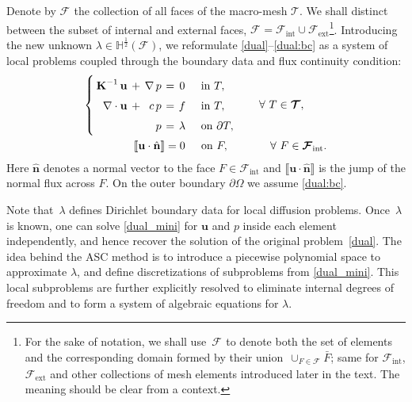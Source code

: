 \documentclass[12pt]{article}
\newcommand{\vect}[1]{\boldsymbol{\mathbf{#1}}}
\newcommand{\bcell}{T}
\newcommand{\bmesh}{{\vect{\mathcal T}}}
\newcommand{\bface}{F}
\newcommand{\bfaces}[1][]{{\vect{\mathcal F}_{\text{#1}}}}
\newcommand{\HHalfSpace}[1][\bface]{{\mathbb H^{\frac{1}{2}}\left({#1}\right)}}
\begin{document}
	Denote by $\bfaces$ the collection of all faces of the macro-mesh $\bmesh$. We shall distinct between the subset of internal and external faces,  $\bfaces = \bfaces[int] \cup \bfaces[ext]$\footnote{For the sake of  notation, we shall use~$\bfaces$ to denote both the set of elements and the corresponding domain formed by their union~$\cup_{F\in \bfaces} \bar{F}$; same for $\bfaces[int]$, $\bfaces[ext]$ and other collections of mesh elements introduced later in the text. The meaning should be clear from a context.}.
	Introducing the new unknown $\lambda \in \HHalfSpace[\bfaces]$, we reformulate \eqref{dual}--\eqref{dual:bc} as a system of local problems coupled through the boundary data
	and flux continuity condition:
	\begin{eqnarray}
		\arraycolsep=2pt\def\arraystretch{1.5}
		\left\{\begin{array}{rcrccl}
			\vect K^{-1}\,\vect u                    & + & \nabla\,p & = & 0       &\quad\text{in } \bcell, \\
			\nabla\cdot\vect u                       & + & c\,p      & = & f       &\quad\text{in } \bcell, \\
			                                         &   & p         & = & \lambda &\quad\text{on } \partial\bcell, %
		\end{array}\right.
		& \qquad \forall~\bcell\in\bmesh, \label{dual_mini} \\
		\llbracket\vect u \cdot \hat{\vect n}\rrbracket = 0\quad\:\:\text{on } F,\:\:\:\:
		& \qquad\quad \forall~F\in\bfaces[int]. \label{flux_cond}
	\end{eqnarray}
	Here $\hat{\vect n}$ denotes a normal vector to the face $F\in\bfaces[int]$ and $\llbracket \vect u\cdot\hat{\vect n} \rrbracket$ is the jump of the normal flux across $F$. On the outer boundary $\partial\Omega$ we assume \eqref{dual:bc}.
	
	Note that~$\lambda$ defines Dirichlet boundary data for local diffusion problems. Once~$\lambda$ is known, one can solve \eqref{dual_mini} for $\vect u$ and $p$ inside each element independently, and hence recover the solution of the original problem~\eqref{dual}. The idea behind the ASC method is to introduce a piecewise polynomial space to approximate $\lambda$, and  define discretizations of subproblems from \eqref{dual_mini}. This local subproblems are further explicitly resolved to eliminate internal degrees of freedom and to form a system of algebraic equations for $\lambda$.
	
\end{document}
